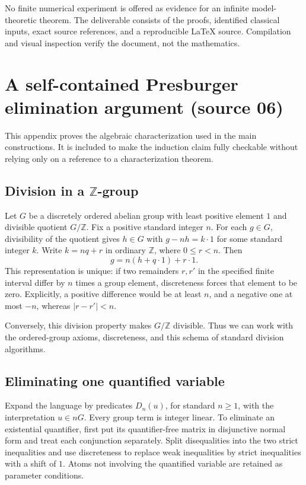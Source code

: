 \documentclass[11pt]{article}
\numberwithin{equation}{section}
\theoremstyle{definition}
\theoremstyle{remark}
\newcommand{\Z}{\mathbb Z}
\begin{document}
No finite numerical experiment is offered as evidence for an infinite
model-theoretic theorem. The deliverable consists of the proofs,
identified classical inputs, exact source references, and a reproducible
LaTeX source. Compilation and visual inspection verify the document, not
the mathematics.

\section{A self-contained Presburger elimination argument (source 06)}
\label{pma:cp:app:qe}

This appendix proves the algebraic characterization used in the main
constructions. It is included to make the induction claim fully
checkable without relying only on a reference to a characterization
theorem.

\subsection{Division in a \texorpdfstring{$\Z$}{Z}-group}

Let $G$ be a discretely ordered abelian group with least positive
element $1$ and divisible quotient $G/\Z$. Fix a positive standard
integer $n$. For each $g\in G$, divisibility of the quotient gives
$h\in G$ with $g-nh=k\cdot1$ for some standard integer $k$.
Write $k=nq+r$ in ordinary $\Z$, where $0\leq r<n$. Then
\[
 g=n(h+q\cdot1)+r\cdot1.
\]
This representation is unique: if two remainders $r,r'$ in the
specified finite interval differ by $n$ times a group element,
discreteness forces that element to be zero. Explicitly, a positive
difference would be at least $n$, and a negative one at most $-n$,
whereas $|r-r'|<n$.

Conversely, this division property makes $G/\Z$ divisible. Thus
we can work with the ordered-group axioms, discreteness, and this
schema of standard division algorithms.

\subsection{Eliminating one quantified variable}

Expand the language by predicates $D_n(u)$, for standard $n\geq1$,
with the interpretation $u\in nG$. Every group term is integer
linear. To eliminate an existential quantifier, first put its
quantifier-free matrix in disjunctive normal form and treat each
conjunction separately. Split disequalities into the two strict
inequalities and use discreteness to replace weak inequalities
by strict inequalities with a shift of $1$. Atoms not involving
the quantified variable are retained as parameter conditions.
\end{document}
